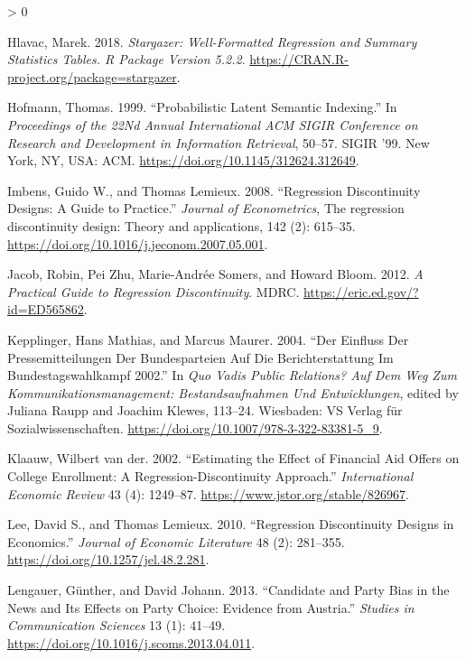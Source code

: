 \documentclass[
]{article}
\newlength{\cslhangindent}
\newenvironment{CSLReferences}[2] %
 {%
  \setlength{\parindent}{0pt}
  \ifodd #1 \everypar{\setlength{\hangindent}{\cslhangindent}}\ignorespaces\fi
  \ifnum #2 > 0
  \setlength{\parskip}{#2\baselineskip}
  \fi
 }%
 {}
\begin{document}
\begin{CSLReferences}{1}{0}
\leavevmode\hypertarget{ref-hlavac_stargazer_2018}{}%
Hlavac, Marek. 2018. \emph{Stargazer: Well-Formatted Regression and
Summary Statistics Tables. R Package Version 5.2.2}.
\url{https://CRAN.R-project.org/package=stargazer}.

\leavevmode\hypertarget{ref-hofmann_probabilistic_1999}{}%
Hofmann, Thomas. 1999. {``Probabilistic Latent Semantic Indexing.''} In
\emph{Proceedings of the 22Nd Annual International {ACM} {SIGIR}
Conference on Research and Development in Information Retrieval},
50--57. {SIGIR} '99. New York, {NY}, {USA}: {ACM}.
\url{https://doi.org/10.1145/312624.312649}.

\leavevmode\hypertarget{ref-imbens_regression_2008}{}%
Imbens, Guido W., and Thomas Lemieux. 2008. {``Regression Discontinuity
Designs: A Guide to Practice.''} \emph{Journal of Econometrics}, The
regression discontinuity design: Theory and applications, 142 (2):
615--35. \url{https://doi.org/10.1016/j.jeconom.2007.05.001}.

\leavevmode\hypertarget{ref-jacob_practical_2012}{}%
Jacob, Robin, Pei Zhu, Marie-Andrée Somers, and Howard Bloom. 2012.
\emph{A Practical Guide to Regression Discontinuity}. {MDRC}.
\url{https://eric.ed.gov/?id=ED565862}.

\leavevmode\hypertarget{ref-kepplinger_einfluss_2004}{}%
Kepplinger, Hans Mathias, and Marcus Maurer. 2004. {``Der Einfluss Der
Pressemitteilungen Der Bundesparteien Auf Die Berichterstattung Im
Bundestagswahlkampf 2002.''} In \emph{Quo Vadis Public Relations? Auf
Dem Weg Zum Kommunikationsmanagement: Bestandsaufnahmen Und
Entwicklungen}, edited by Juliana Raupp and Joachim Klewes, 113--24.
Wiesbaden: {VS} Verlag für Sozialwissenschaften.
\url{https://doi.org/10.1007/978-3-322-83381-5_9}.

\leavevmode\hypertarget{ref-van_der_klaauw_estimating_2002}{}%
Klaauw, Wilbert van der. 2002. {``Estimating the Effect of Financial Aid
Offers on College Enrollment: A Regression-Discontinuity Approach.''}
\emph{International Economic Review} 43 (4): 1249--87.
\url{https://www.jstor.org/stable/826967}.

\leavevmode\hypertarget{ref-lee_regression_2010}{}%
Lee, David S., and Thomas Lemieux. 2010. {``Regression Discontinuity
Designs in Economics.''} \emph{Journal of Economic Literature} 48 (2):
281--355. \url{https://doi.org/10.1257/jel.48.2.281}.

\leavevmode\hypertarget{ref-lengauer_candidate_2013}{}%
Lengauer, Günther, and David Johann. 2013. {``Candidate and Party Bias
in the News and Its Effects on Party Choice: Evidence from Austria.''}
\emph{Studies in Communication Sciences} 13 (1): 41--49.
\url{https://doi.org/10.1016/j.scoms.2013.04.011}.


\end{CSLReferences}
\end{document}
